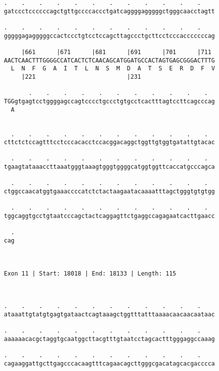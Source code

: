 \documentclass{article}
\begin{document}
\begin{Verbatim}
.    .    .    .    .    .    .    .    .    .    .    .    
gatccctccccccagctgttgccccaccctgatcaggggagggggctgggcaacctagtt
                                                            
.    .    .    .    .    .    .    .    .    .    .    .    
gggggagagggggccactccctgtcctccagcttagccctgcttcctcccacccccccag
                                                            
     |661      |671      |681      |691      |701      |711 
AACTCAACTTTGGGGCCATCACTCTCAACAGCATGGATGCCACTAGTGAGCGGGACTTTG
  L  N  F  G  A  I  T  L  N  S  M  D  A  T  S  E  R  D  F  V
     |221                          |231                     
  
       .    .    .    .    .    .    .    .    .    .    .  
TGGgtgagtcctggggagccagtcccctgccctgtgcctcactttagtccttcagcccag
  A                                                         
                                                            
  
  .    .    .    .    .    .    .    .    .    .    .    .  
cttctctccagtttcctcccacacctccacggacaggctggttgtggtgatattgtacac
                                                            
  .    .    .    .    .    .    .    .    .    .    .    .  
tgaagtataaaccttaaatgggtaaagtgggtggggcatggtggttcaccatgcccagca
                                                            
  .    .    .    .    .    .    .    .    .    .    .    .  
ctggccaacatggtgaaaccccatctctactaagaatacaaaatttagctgggtgtgtgg
                                                            
  .    .    .    .    .    .    .    .    .    .    .    .  
tggcaggtgcctgtaatcccagctactcaggagttctgaggccagagaatcacttgaacc
                                                            
  .
cag
   
   
 
Exon 11 | Start: 18018 | End: 18133 | Length: 115



.    .    .    .    .    .    .    .    .    .    .    .    
ataaattgtatgtgagtgataactcagtaaagctggtttatttaaaacaacaacaataac
                                                            
.    .    .    .    .    .    .    .    .    .    .    .    
aaaaaacacgctaggtgcaatggcttacgtttgtaatcctagcactttgggaggccaaag
                                                            
.    .    .    .    .    .    .    .    .    .    .    .    
cagaaggattgcttgagcccacaagtttcagaacagcttgggcgacatagcacgacccca
                                                            

\end{Verbatim}
\end{document}
